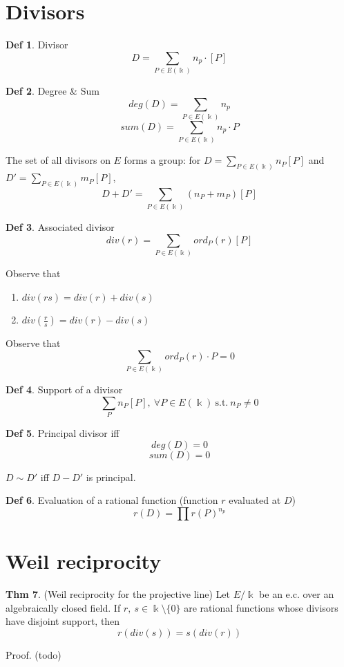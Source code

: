 \documentclass{article}
\theoremstyle{definition}
\newtheorem{definition}{Def}[section]
\newtheorem{theorem}[definition]{Thm}
\begin{document}
\section{Divisors}

\begin{definition}{Divisor}
  $$D= \sum_{P \in E(\Bbbk)} n_p \cdot [P]$$
\end{definition}

\begin{definition}{Degree \& Sum}
  $$deg(D)= \sum_{P \in E(\Bbbk)} n_p$$
  $$sum(D)= \sum_{P \in E(\Bbbk)} n_p \cdot P$$
\end{definition}


The set of all divisors on $E$ forms a group: for $D = \sum_{P\in E(\Bbbk)} n_P[P]$ and $D' = \sum_{P\in E(\Bbbk)} m_P[P]$,
$$D+D' = \sum_{P\in E(\Bbbk)} (n_P + m_P)[P]$$

\begin{definition}{Associated divisor}
  $$div(r) = \sum_{P \in E(\Bbbk)} ord_P(r)[P]$$
\end{definition}

Observe that
\begin{enumerate}
  \item[] $div(rs) = div(r)+div(s)$
  \item[] $div(\frac{r}{s}) = div(r)-div(s)$
\end{enumerate}

Observe that
$$\sum_{P \in E(\Bbbk)} ord_P(r) \cdot P = 0$$

\begin{definition}{Support of a divisor}
  $$\sum_P n_P[P], ~\forall P \in E(\Bbbk) ~\text{s.t.}~ n_P \neq 0$$
\end{definition}

\begin{definition}{Principal divisor}
  iff
  $$deg(D)=0$$
  $$sum(D)=0$$
\end{definition}
$D \sim D'$ iff $D - D'$ is principal.


\begin{definition}{Evaluation of a rational function} (function $r$ evaluated at $D$)
  $$r(D)= \prod r(P)^{n_p}$$
\end{definition}

\section{Weil reciprocity}
\begin{theorem}{(Weil reciprocity for the projective line)}
  Let $E/ \Bbbk$ be an e.c. over an algebraically closed field. If $r,~s \in \Bbbk\setminus \{0\}$ are rational functions whose divisors have disjoint support, then
$$r(div(s)) = s(div(r))$$
\end{theorem}
Proof. (todo)
\end{document}

